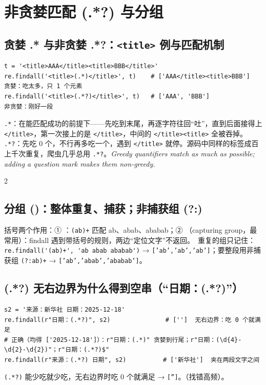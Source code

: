 \section{非贪婪匹配 (.*?) 与分组}

\subsection{贪婪 .* 与非贪婪 .*?：\texorpdfstring{\texttt{<title>}}{<title>} 例与匹配机制}\label{sec:D06-greedy}
\begin{lstlisting}[style=pyD06]
t = '<title>AAA</title><title>BBB</title>'
re.findall('<title>(.*)</title>', t)    # ['AAA</title><title>BBB']  贪婪：吃太多，只 1 个元素
re.findall('<title>(.*?)</title>', t)   # ['AAA', 'BBB']             非贪婪：刚好一段
\end{lstlisting}
 \texttt{.*}：在能匹配成功的前提下——先吃到末尾，再逐字符往回“吐”，直到后面接得上 \texttt{</title>}，第一次接上的是 \texttt{</title>}，中间的 \texttt{</title><title>} 全被吞掉。 \texttt{.*?}：先吃 0 个，不行再多吃一个，遇到 \texttt{</title>} 就停。源码中同样的标签成百上千次重复，爬虫几乎总用 \texttt{.*?}。\textit{Greedy quantifiers match as much as possible; adding a question mark makes them non-greedy.}

\begin{multicols}{2}\raggedcolumns\sloppy
\subsection{分组 ()：整体重复、捕获；非捕获组 (?:)}\label{sec:D06-group}
括号两个作用：① ：\texttt{(ab)+} 匹配 ab、abab、ababab；② （capturing group，最常用）：findall 遇到带括号的规则，两边“定位文字”不返回。\tagext\ 重复的组只记住：\lstinline|re.findall('(ab)+', 'ab abab ababab')| → \texttt{['ab','ab','ab']}；要整段用非捕获组 \lstinline|(?:ab)+| → \texttt{['ab','abab','ababab']}。
\end{multicols}

\subsection{(.*?) 无右边界为什么得到空串（“日期：(.*?)”）}\label{sec:D06-empty}
\begin{lstlisting}[style=pyD06]
s2 = '来源：新华社 日期：2025-12-18'
re.findall(r"日期：(.*?)", s2)               # ['']  无右边界：吃 0 个就满足
# 正确（均得 ['2025-12-18']）：r"日期：(.*)" 贪婪到行尾；r"日期：(\d{4}-\d{2}-\d{2})"；r"日期：(.*?)$"
re.findall(r"来源：(.*?) 日期", s2)          # ['新华社']  夹在两段文字之间
\end{lstlisting}
\texttt{(.*?)} 能少吃就少吃，无右边界时吃 0 个就满足 → \texttt{['']}。（找错高频）。

